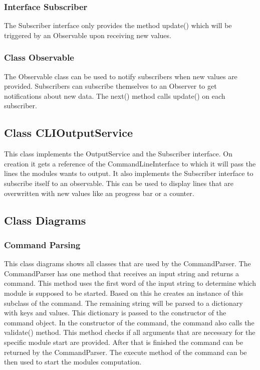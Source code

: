 \documentclass[parskip=full]{scrartcl}
\begin{document}
 \subsubsection{Interface Subscriber}
The Subscriber interface only provides the method update() which will be triggered by an Observable upon receiving new values.

\subsubsection{Class Observable} 
The Observable class can be used to notify subscribers when new values are provided.
Subscribers can subscribe themselves to an Observer to get notifications about new data.
The next() method calls update() on each subscriber.

\subsection{Class CLIOutputService}
This class implements the OutputService and the Subscriber interface. 
On creation it gets a reference of the CommandLineInterface to which it will pass the lines the modules wants to output.
It also implements the Subscriber interface to subscribe itself to an observable.
This can be used to display lines that are overwritten with new values like an progress bar or a counter.

\newpage

\subsection{Class Diagrams}

\subsubsection{Command Parsing}

\begin{figure}[h]
\begin{center}

\label{Command Parsing}
\end{center}
\end{figure}
\newpage

This class diagrams shows all classes that are used by the CommandParser.
The CommandParser has one method that receives an input string and returns a command.
This method uses the first word of the input string to determine which module is supposed to be started.
Based on this he creates an instance of this subclass of the command.
The remaining string will be parsed to a dictionary with keys and values.
This dictionary is passed to the constructor of the command object.
In the constructor of the command, the command also calls the validate() method.
This method checks if all arguments that are necessary for the specific module start are provided.
After that is finished the command can be returned by the CommandParser.
The execute method of the command can be then used to start the modules computation.
\end{document}
